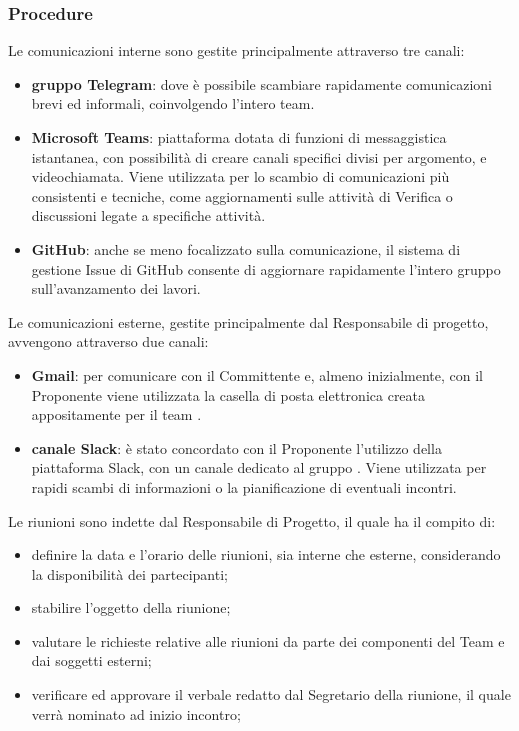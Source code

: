 		\subsubsection{Procedure}
			Le comunicazioni interne sono gestite principalmente attraverso tre canali: 
			\begin{itemize}
				\item \textbf{gruppo Telegram}: dove è possibile scambiare rapidamente comunicazioni brevi ed informali, coinvolgendo l'intero team.
				\item \textbf{Microsoft Teams}: piattaforma dotata di funzioni di messaggistica istantanea, con possibilità di creare canali specifici divisi per argomento, e videochiamata. Viene utilizzata per lo scambio di comunicazioni più consistenti e tecniche, come aggiornamenti sulle attività di Verifica o discussioni legate a specifiche attività.
				\item \textbf{GitHub}: anche se meno focalizzato sulla comunicazione, il sistema di gestione Issue di GitHub consente di aggiornare rapidamente l'intero gruppo sull'avanzamento dei lavori.
			\end{itemize}
			Le comunicazioni esterne, gestite principalmente dal Responsabile di progetto, avvengono attraverso due canali:
			\begin{itemize}
				\item \textbf{Gmail}: per comunicare con il Committente e, almeno inizialmente, con il Proponente viene utilizzata la casella di posta elettronica creata appositamente per il team \Gruppo{}.
				\item \textbf{canale Slack}: è stato concordato con il Proponente \Proponente{} l'utilizzo della piattaforma Slack, con un canale dedicato al gruppo \Gruppo{}. Viene utilizzata per rapidi scambi di informazioni o la pianificazione di eventuali incontri. 
			\end{itemize}
			Le riunioni sono indette dal Responsabile di Progetto, il quale ha il compito di:
			\begin{itemize}
				\item definire la data e l'orario delle riunioni, sia interne che esterne, considerando la disponibilità dei partecipanti;
				\item stabilire l'oggetto della riunione;
				\item valutare le richieste relative alle riunioni da parte dei componenti del Team \Gruppo{} e dai soggetti esterni;
				\item verificare ed approvare il verbale redatto dal Segretario della riunione, il quale verrà nominato ad inizio incontro;
			\end{itemize}
